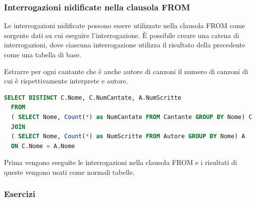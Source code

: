 \documentclass[a4paper]{article}
\begin{document}
\subsubsection{Interrogazioni nidificate nella clausola FROM}
Le interrogazioni nidificate possono essere utilizzate nella clausola FROM come
sorgente dati su cui eseguire l’interrogazione.
È possibile creare una catena di interrogazioni, dove ciascuna
interrogazione utilizza il risultato della precedente come una
tabella di base.

\begin{example}
  Estrarre per ogni cantante che è anche autore di canzoni il numero
  di canzoni di cui è rispettivamente interprete e autore.
\begin{lstlisting}[language=SQL]
SELECT DISTINCT C.Nome, C.NumCantate, A.NumScritte
  FROM
  ( SELECT Nome, Count(*) as NumCantate FROM Cantante GROUP BY Nome) C
  JOIN
  ( SELECT Nome, Count(*) as NumScritte FROM Autore GROUP BY Nome) A
  ON C.Nome = A.Nome
\end{lstlisting}
  Prima vengono eseguite le interrogazioni nella clausola FROM e i
  risultati di queste vengono usati come normali tabelle.
\end{example}

\subsubsection{Esercizi}
\end{document}
